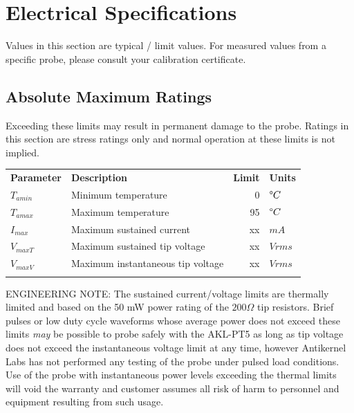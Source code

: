\documentclass[11pt]{article}
\newcommand{\thinhline}{\Xhline{1\arrayrulewidth}}
\newcommand{\thickhline}{\Xhline{2.5\arrayrulewidth}}
\begin{document}
\pagebreak
\section{Electrical Specifications}

Values in this section are typical / limit values. For measured values from a specific probe, please consult your
calibration certificate.

\subsection{Absolute Maximum Ratings}

Exceeding these limits may result in permanent damage to the probe. Ratings in this section are stress ratings only and
normal operation at these limits is not implied.

\begin{tabularx}{12cm}{lXrl}
\thickhline
\textbf{Parameter} & \textbf{Description} & \textbf{Limit} & \textbf{Units} \\
\thickhline
$T_{amin}$ & Minimum temperature & 0 & $ \degree C$ \\
\thinhline
$T_{amax}$ & Maximum temperature & 95 & $ \degree C$ \\
\thinhline
$I_{max}$ & Maximum sustained current & xx & $ mA $ \\
\thinhline
$V_{maxT}$ & Maximum sustained tip voltage & xx & $ Vrms $ \\
\thinhline
$V_{maxV}$ & Maximum instantaneous tip voltage & xx & $ Vrms $ \\
\thickhline
\end{tabularx}

ENGINEERING NOTE: The sustained current/voltage limits are thermally limited and based on the 50 mW power rating of the
$200 \Omega$ tip resistors. Brief pulses or low duty cycle waveforms whose average power does not exceed these limits
\emph{may} be possible to probe safely with the AKL-PT5 as long as tip voltage does not exceed the instantaneous
voltage limit at any time, however Antikernel Labs has not performed any testing of the probe under pulsed load
conditions. Use of the probe with instantaneous power levels exceeding the thermal limits will void the warranty and
customer assumes all risk of harm to personnel and equipment resulting from such usage.

\end{document}
